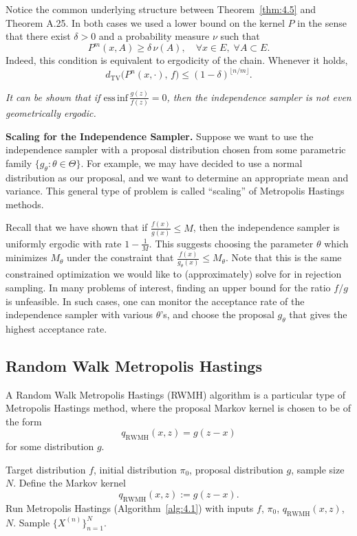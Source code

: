 Notice the common underlying structure between Theorem~\ref{thm:4.5} and Theorem A.25. In both
cases we used a lower bound on the kernel $P$ in the sense that there exist $\delta > 0$ and a probability
measure $\nu$ such that
\[
  P^m(x, A) \geq \delta\,\nu(A), \quad \forall x \in E,\; \forall A \subset E.
\]
Indeed, this condition is equivalent to ergodicity of the chain. Whenever it holds,
\[
  d_{\mathrm{TV}}\!\bigl(P^n(x, \cdot),\, f\bigr) \leq (1-\delta)^{\lfloor n/m \rfloor}.
\]

\begin{remark}
\label{rem:4.6}
\textit{It can be shown that if $\mathrm{ess\,inf}\, \frac{g(z)}{f(z)} = 0$, then the independence sampler is not even
geometrically ergodic.}
\end{remark}

\medskip
\noindent\textbf{Scaling for the Independence Sampler.}
Suppose we want to use the independence sampler
with a proposal distribution chosen from some parametric family $\{g_\theta : \theta \in \Theta\}$. For example,
we may have decided to use a normal distribution as our proposal, and we want to determine an
appropriate mean and variance. This general type of problem is called ``scaling'' of Metropolis
Hastings methods.

Recall that we have shown that if $\frac{f(x)}{g(x)} \leq M$, then the independence sampler is uniformly
ergodic with rate $1 - \frac{1}{M}$. This suggests choosing the parameter $\theta$ which minimizes $M_\theta$ under
the constraint that $\frac{f(x)}{g_\theta(x)} \leq M_\theta$. Note that this is the same constrained optimization we would
like to (approximately) solve for in rejection sampling. In many problems of interest, finding an
upper bound for the ratio $f/g$ is unfeasible. In such cases, one can monitor the acceptance rate
of the independence sampler with various $\theta$'s, and choose the proposal $g_\theta$ that gives the highest
acceptance rate.

\subsection{Random Walk Metropolis Hastings}
\label{sec:4.2.2}

A Random Walk Metropolis Hastings (RWMH) algorithm is a particular type of Metropolis
Hastings method, where the proposal Markov kernel is chosen to be of the form
\[
  q_{\mathrm{RWMH}}(x, z) = g(z - x)
\]
for some distribution $g$.

\begin{algorithm}[H]
\caption{Random Walk Metropolis Hastings (RWMH)}
\label{alg:4.3}
\begin{algorithmic}[1]
\Require Target distribution $f$, initial distribution $\pi_0$, proposal distribution $g$, sample size $N$.
\State Define the Markov kernel
\[
  q_{\mathrm{RWMH}}(x, z) := g(z - x).
\]
\State Run Metropolis Hastings (Algorithm~\ref{alg:4.1}) with inputs $f$, $\pi_0$, $q_{\mathrm{RWMH}}(x,z)$, $N$.
\Ensure Sample $\{X^{(n)}\}_{n=1}^{N}$.
\end{algorithmic}
\end{algorithm}

